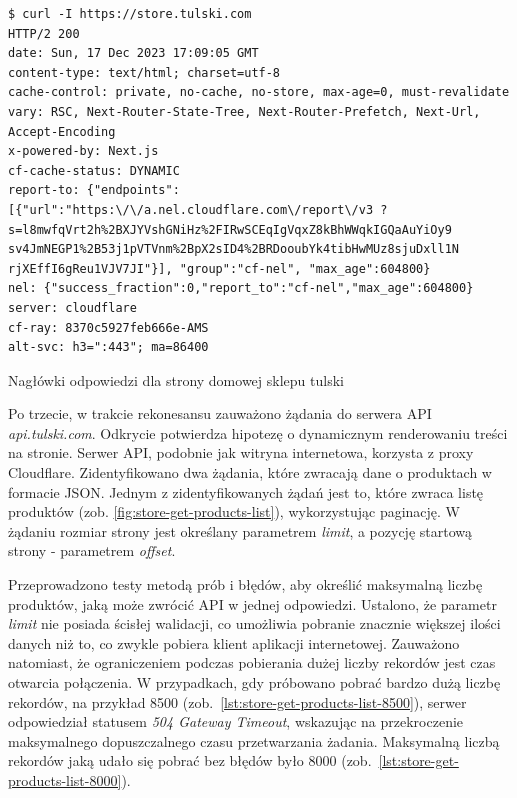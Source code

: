 \begin{listing}[H]
    \begin{verbatim}
$ curl -I https://store.tulski.com
HTTP/2 200
date: Sun, 17 Dec 2023 17:09:05 GMT
content-type: text/html; charset=utf-8
cache-control: private, no-cache, no-store, max-age=0, must-revalidate
vary: RSC, Next-Router-State-Tree, Next-Router-Prefetch, Next-Url, Accept-Encoding
x-powered-by: Next.js
cf-cache-status: DYNAMIC
report-to: {"endpoints":[{"url":"https:\/\/a.nel.cloudflare.com\/report\/v3 ?s=l8mwfqVrt2h%2BXJYVshGNiHz%2FIRwSCEqIgVqxZ8kBhWWqkIGQaAuYiOy9 sv4JmNEGP1%2B53j1pVTVnm%2BpX2sID4%2BRDooubYk4tibHwMUz8sjuDxll1N rjXEffI6gReu1VJV7JI"}], "group":"cf-nel", "max_age":604800}
nel: {"success_fraction":0,"report_to":"cf-nel","max_age":604800}
server: cloudflare
cf-ray: 8370c5927feb666e-AMS
alt-svc: h3=":443"; ma=86400
    \end{verbatim}
    \caption{Nagłówki odpowiedzi dla strony domowej sklepu tulski}
    \label{lst:rekonesans-get-homepage}
\end{listing}

Po trzecie, w trakcie rekonesansu zauważono żądania do serwera API \emph{api.tulski.com}.
Odkrycie potwierdza hipotezę o dynamicznym renderowaniu treści na stronie.
Serwer API, podobnie jak witryna internetowa, korzysta z proxy Cloudflare.
Zidentyfikowano dwa żądania, które zwracają dane o produktach w formacie JSON\@.
Jednym z zidentyfikowanych żądań jest to, które zwraca listę produktów (zob. \autoref{fig:store-get-products-list}), wykorzystując paginację.
W żądaniu rozmiar strony jest określany parametrem \emph{limit}, a pozycję startową strony - parametrem \emph{offset}.

Przeprowadzono testy metodą prób i błędów, aby określić maksymalną liczbę produktów, jaką może zwrócić API w jednej odpowiedzi.
Ustalono, że parametr \emph{limit} nie posiada ścisłej walidacji, co umożliwia pobranie znacznie większej ilości danych niż to, co zwykle pobiera klient aplikacji internetowej.
Zauważono natomiast, że ograniczeniem podczas pobierania dużej liczby rekordów jest czas otwarcia połączenia.
W przypadkach, gdy próbowano pobrać bardzo dużą liczbę rekordów, na przykład 8500 (zob.~\autoref{lst:store-get-products-list-8500}), serwer odpowiedział statusem \emph{504 Gateway Timeout}, wskazując na przekroczenie maksymalnego dopuszczalnego czasu przetwarzania żadania.
Maksymalną liczbą rekordów jaką udało się pobrać bez błędów było 8000 (zob.~\autoref{lst:store-get-products-list-8000}).

